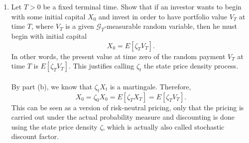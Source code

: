 \documentclass[11pt,a4,table]{article}
\begin{document}
\begin{enumerate}
\begin{enumerate}
        \item Let $T>0$ be a fixed terminal time. Show that if an investor wants to begin with some initial capital $X_0$ and invest in order to have portfolio value $V_T$ at time $T$, where $V_T$ is a given $\mathcal{G}_T$-measurable random variable, then he must begin with initial capital
        \begin{equation*}
            X_0 = E[\zeta_T V_T].
        \end{equation*}
        In other words, the present value at time zero of the random payment $V_T$ at time $T$ is $E[\zeta_T V_T]$. This justifies calling $\zeta_t$ the state price density process.\\\\
        By part (b), we know that $\zeta_tX_t$ is a martingale. Therefore,
        \begin{equation*}
            X_0=\zeta_0X_0 =E[\zeta_T X_T] = E[\zeta_T V_T].
        \end{equation*}
        This can be seen as a version of risk-neutral pricing, only that the pricing is carried out under the actual probability measure and discounting is done using the state price density $\zeta$, which is actually also called stochastic discount factor.
    \end{enumerate}
    
\end{enumerate}
\end{document}
